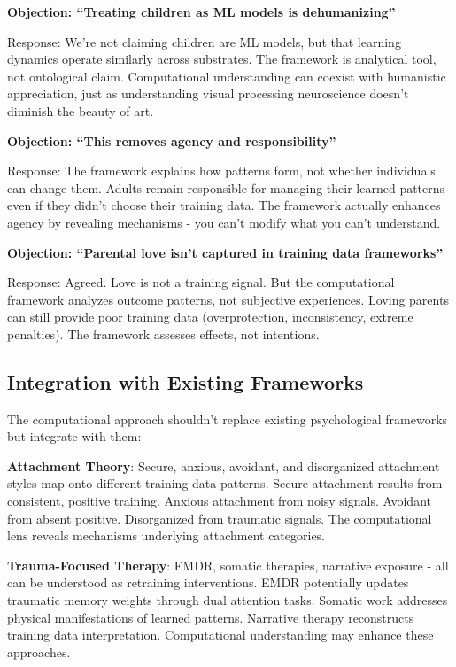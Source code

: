 \documentclass{article}
\begin{document}
\textbf{Objection: ``Treating children as ML models is dehumanizing''}

Response: We're not claiming children are ML models, but that learning dynamics operate similarly across substrates. The framework is analytical tool, not ontological claim. Computational understanding can coexist with humanistic appreciation, just as understanding visual processing neuroscience doesn't diminish the beauty of art.

\textbf{Objection: ``This removes agency and responsibility''}

Response: The framework explains how patterns form, not whether individuals can change them. Adults remain responsible for managing their learned patterns even if they didn't choose their training data. The framework actually enhances agency by revealing mechanisms - you can't modify what you can't understand.

\textbf{Objection: ``Parental love isn't captured in training data frameworks''}

Response: Agreed. Love is not a training signal. But the computational framework analyzes outcome patterns, not subjective experiences. Loving parents can still provide poor training data (overprotection, inconsistency, extreme penalties). The framework assesses effects, not intentions.

\subsection{Integration with Existing Frameworks}

The computational approach shouldn't replace existing psychological frameworks but integrate with them:

\textbf{Attachment Theory}: Secure, anxious, avoidant, and disorganized attachment styles map onto different training data patterns. Secure attachment results from consistent, positive training. Anxious attachment from noisy signals. Avoidant from absent positive. Disorganized from traumatic signals. The computational lens reveals mechanisms underlying attachment categories.

\textbf{Trauma-Focused Therapy}: EMDR, somatic therapies, narrative exposure - all can be understood as retraining interventions. EMDR potentially updates traumatic memory weights through dual attention tasks. Somatic work addresses physical manifestations of learned patterns. Narrative therapy reconstructs training data interpretation. Computational understanding may enhance these approaches.
\end{document}
